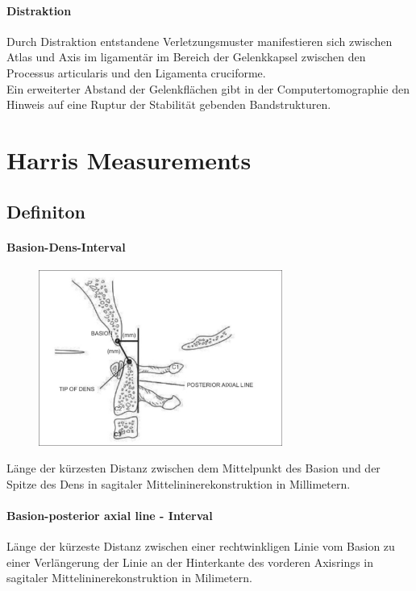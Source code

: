 \documentclass{report}
\begin{document}
\paragraph{Distraktion}
Durch Distraktion entstandene Verletzungsmuster manifestieren sich zwischen Atlas und Axis im ligamentär im Bereich der Gelenkkapsel zwischen den Processus articularis und den Ligamenta cruciforme.\\
Ein erweiterter Abstand der Gelenkflächen gibt in der Computertomographie den Hinweis auf eine Ruptur der Stabilität gebenden Bandstrukturen. \cite{Gonzalez2004,Chaput2011,Radcliff2010}

\section{Harris Measurements}
\subsection{Definiton}
\paragraph{Basion-Dens-Interval}

\begin{figure}[h]
        \includegraphics[width=8cm]{BDI.png}
\end{figure}

Länge der kürzesten Distanz zwischen dem Mittelpunkt des Basion und der Spitze des Dens in sagitaler Mittelininerekonstruktion in Millimetern.


\paragraph{Basion-posterior axial line - Interval}
Länge der kürzeste Distanz zwischen einer rechtwinkligen Linie vom Basion zu einer Verlängerung der Linie an der Hinterkante des vorderen Axisrings in sagitaler Mittelininerekonstruktion in Milimetern.
\end{document}
